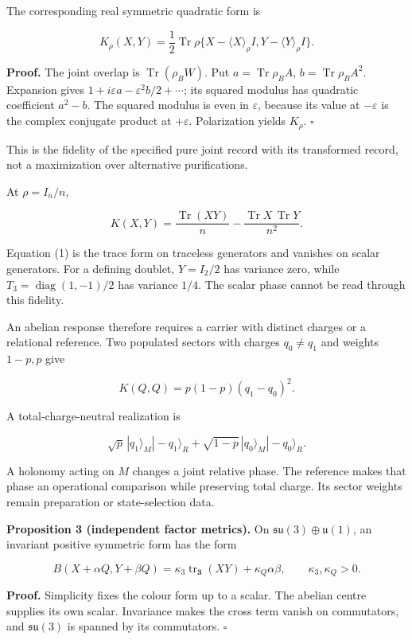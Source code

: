 \documentclass[
  11pt,
  a4paper,
]{article}
\begin{document}
The corresponding real symmetric quadratic form is

\[
 K_\rho(X,Y)=\frac12\operatorname{Tr}\rho
 \{X-\langle X\rangle_\rho I,Y-\langle Y\rangle_\rho I\}.
\]

\textbf{Proof.} The joint overlap is \(\operatorname{Tr}(\rho_BW)\). Put \(a=\operatorname{Tr}\rho_BA\), \(b=\operatorname{Tr}\rho_BA^2\). Expansion gives \(1+i\varepsilon a-\varepsilon^2b/2+\cdots\); its squared modulus has quadratic coefficient \(a^2-b\). The squared modulus is even in \(\varepsilon\), because its value at \(-\varepsilon\) is the complex conjugate product at \(+\varepsilon\). Polarization yields \(K_\rho\). \(\square\)

This is the fidelity of the specified pure joint record with its transformed record, not a maximization over alternative purifications.

At \(\rho=I_n/n\),

\[
 K(X,Y)=\frac{\operatorname{Tr}(XY)}n
       -\frac{\operatorname{Tr}X\,\operatorname{Tr}Y}{n^2}. \tag{1}
\]

Equation (1) is the trace form on traceless generators and vanishes on scalar generators. For a defining doublet, \(Y=I_2/2\) has variance zero, while \(T_3=\operatorname{diag}(1,-1)/2\) has variance \(1/4\). The scalar phase cannot be read through this fidelity.

An abelian response therefore requires a carrier with distinct charges or a relational reference. Two populated sectors with charges \(q_0\ne q_1\) and weights \(1-p,p\) give

\[
 K(Q,Q)=p(1-p)(q_1-q_0)^2.
\]

A total-charge-neutral realization is

\[
 \sqrt p\,|q_1\rangle_M|-q_1\rangle_R+
 \sqrt{1-p}\,|q_0\rangle_M|-q_0\rangle_R.
\]

A holonomy acting on \(M\) changes a joint relative phase. The reference makes that phase an operational comparison while preserving total charge. Its sector weights remain preparation or state-selection data.

\textbf{Proposition 3 (independent factor metrics).} On \(\mathfrak{su}(3)\oplus\mathfrak u(1)\), an invariant positive symmetric form has the form

\[
 B(X+\alpha Q,Y+\beta Q)
 =\kappa_3\operatorname{tr}_{\mathbf3}(XY)+\kappa_Q\alpha\beta,
 \qquad \kappa_3,\kappa_Q>0.
\]

\textbf{Proof.} Simplicity fixes the colour form up to a scalar. The abelian centre supplies its own scalar. Invariance makes the cross term vanish on commutators, and \(\mathfrak{su}(3)\) is spanned by its commutators. \(\square\)
\end{document}
